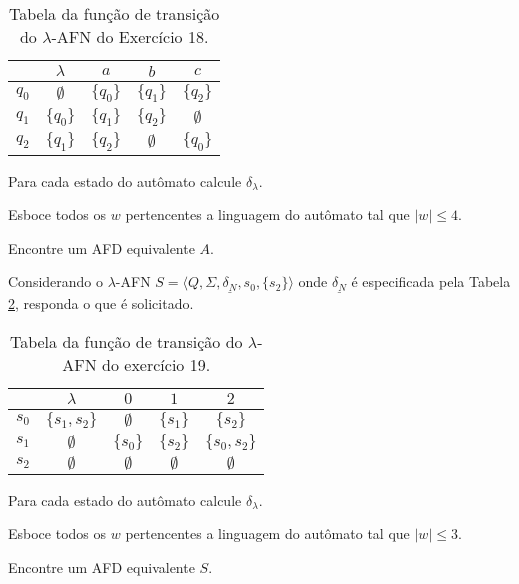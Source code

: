 \begin{table}[h]
	\centering
	\begin{tabular}{c|cccc}
		\backslashbox{$Q'$}{$\Sigma \cup \{\lambda\}$}	& $\lambda$ & $a$ & $b$ & $c$\\\hline
		$q_0$ & $\emptyset$ & $\{q_0\}$ & $\{q_1\}$ & $\{q_2\}$\\
		$q_1$ & $\{q_0\}$ & $\{q_1\}$ & $\{q_2\}$ & $\emptyset$\\
		$q_2$ & $\{q_1\}$ & $\{q_2\}$ & $\emptyset$ & $\{q_0\}$ 		
	\end{tabular}
	\caption{Tabela da função de transição do $\lambda$-AFN do Exercício 18.}
	\label{tab:DeltaLAFN-Exe25}
\end{table}

\begin{exerList}
	\item Para cada estado do autômato calcule $\delta_\lambda$.
	\item Esboce todos os $w$ pertencentes a linguagem do autômato tal que $|w| \leq 4$.
	\item Encontre um AFD equivalente $A$. 
\end{exerList}

\begin{problem}\label{prob:Regulares19}
	Considerando o $\lambda$-AFN $S = \langle Q, \Sigma, \underline{\delta_N}, s_0, \{s_2\} \rangle$ onde $\underline{\delta_N}$ é especificada pela Tabela \ref{tab:DeltaLAFN-Exe26}, responda o que é solicitado.
\end{problem}

\begin{table}[h]
	\centering
	\begin{tabular}{c|cccc}
		\backslashbox{$Q'$}{$\Sigma \cup \{\lambda\}$}	& $\lambda$ & $0$ & $1$ & $2$\\\hline
		$s_0$ & $\{s_1, s_2\}$ & $\emptyset$  & $\{s_1\}$ & $\{s_2\}$\\
		$s_1$ & $\emptyset$ & $\{s_0\}$ & $\{s_2\}$ & $\{s_0, s_2\}$ \\
		$s_2$ & $\emptyset$ & $\emptyset$ & $\emptyset$ & $\emptyset$ 		
	\end{tabular}
	\caption{Tabela da função de transição do $\lambda$-AFN do exercício 19.}
	\label{tab:DeltaLAFN-Exe26}
\end{table}

\begin{exerList}
	\item Para cada estado do autômato calcule $\delta_\lambda$.
	\item Esboce todos os $w$ pertencentes a linguagem do autômato tal que $|w| \leq 3$.
	\item Encontre um AFD equivalente $S$. 
\end{exerList}

